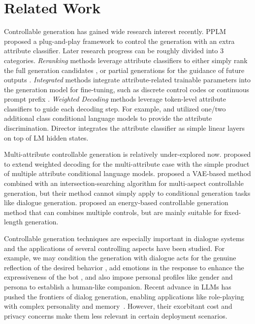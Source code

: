 \section{Related Work}

Controllable generation has gained wide research interest recently. PPLM \citep{dathathri2019plug} proposed a plug-and-play framework to control the generation with an extra attribute classifier. Later research progress can be roughly divided into 3 categories. \textit{Reranking} methods leverage attribute classifiers to either simply rank the full generation candidates \citep{thoppilan2022lamda}, or partial generations for the guidance of future outputs \citep{yang2021fudge}. \textit{Integrated} methods integrate attribute-related trainable parameters into the generation model for fine-tuning, such as discrete control codes \citep{keskar2019ctrl} or continuous prompt prefix \citep{qian2022controllable}. \textit{Weighted Decoding} methods leverage token-level attribute classifiers to guide each decoding step. For example, \citet{krause2021gedi} and \citet{liu2021dexperts} utilized one/two additional class conditional language models to provide the attribute discrimination. Director \citep{arora2022director} integrates the attribute classifier as simple linear layers on top of LM hidden states.  

Multi-attribute controllable generation is relatively under-explored now. \citet{lin2021plug} proposed to extend weighted decoding for the multi-attribute case with the simple product of multiple attribute conditional language models. \citet{gu2022distributional} proposed a VAE-based method combined with an intersection-searching algorithm for multi-aspect controllable generation, but their method cannot simply apply to conditional generation tasks like dialogue generation. \citet{mireshghallah2022mix} proposed an energy-based controllable generation method that can combines multiple controls, but are mainly suitable for fixed-length generation. 

Controllable generation techniques are especially important in dialogue systems and the applications of several controlling aspects have been studied. For example, we may condition the generation with dialogue acts for the genuine reflection of the desired behavior \citep{wen2015semantically}, add emotions in the response to enhance the expressiveness of the bot \citep{zhou2018emotional}, and also impose personal profiles like gender \citep{su2020stylistic} and persona \citep{zhang2018personalizing} to establish a human-like companion.
Recent advance in LLMs has pushed the frontiers of dialog generation, 
enabling applications like role-playing with complex personality and 
memory~\citep{park2023generative}. However, their exorbitant
cost and privacy concerns make them less relevant in certain deployment 
scenarios.

